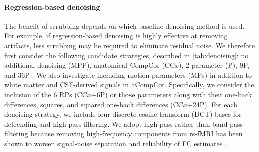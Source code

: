\documentclass{article}
\begin{document}
\paragraph{Regression-based denoising} %
The benefit of scrubbing depends on which baseline denoising method is used. For example, if regression-based denoising is highly effective at removing artifacts, less scrubbing may be required to eliminate residual noise. We therefore first consider the following candidate strategies, described in \autoref{tab:denoising}: no additional denoising (MPP), anatomical CompCor (CC$x$), 2 parameter (P), 9P, and 36P 
\citep{behzadiComponentBasedNoise2007, satterthwaiteImprovedFrameworkConfound2013, muschelliReductionMotionrelatedArtifacts2014, satterthwaiteMotionArtifactStudies2019, parkesEvaluationEfficacyReliability2018}. We also investigate including motion parameters (MPs) in addition to white matter and CSF-derived signals in aCompCor. Specifically, we consider the inclusion of the 6 RPs (CC$x$+6P) or those parameters along with their one-back differences, squares, and squared one-back differences (CC$x$+24P).  For each denoising strategy, we include four discrete cosine transform (DCT) bases for detrending and high-pass filtering. We adopt high-pass rather than band-pass filtering because removing high-frequency components from rs-fMRI has been shown to worsen signal-noise separation and reliability of FC estimates \citep{shirerOptimizationRsfMRIPreprocessing2015}.  
\end{document}
